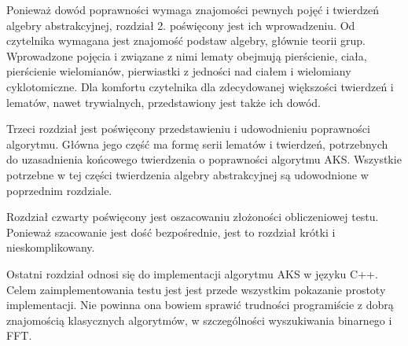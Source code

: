 \documentclass[declaration,shortabstract]{iithesis}
\theoremstyle{definition}
\theoremstyle{remark} \newtheorem{observation}{Obserwacja}
\theoremstyle{plain} \newtheorem{theorem}{Twierdzenie}
\theoremstyle{plain} \newtheorem{lemma}{Lemat}
\theoremstyle{remark} \newtheorem*{remark*}{Uwaga}
\theoremstyle{reminder} \newtheorem*{reminder*}{Przypomnienie}
\begin{document}
Ponieważ dowód poprawności wymaga znajomości pewnych pojęć i twierdzeń algebry abstrakcyjnej, rozdział 2. poświęcony jest ich wprowadzeniu. Od czytelnika wymagana jest znajomość podstaw algebry, głównie teorii grup. Wprowadzone pojęcia i związane z nimi lematy obejmują pierścienie, ciała, pierścienie wielomianów, pierwiastki z jedności nad ciałem i wielomiany cyklotomiczne. Dla komfortu czytelnika dla zdecydowanej większości twierdzeń i lematów, nawet trywialnych, przedstawiony jest także ich dowód.

Trzeci rozdział jest poświęcony przedstawieniu i udowodnieniu poprawności algorytmu. Główna jego część ma formę serii lematów i twierdzeń, potrzebnych do uzasadnienia końcowego twierdzenia o poprawności algorytmu AKS. Wszystkie potrzebne w tej części twierdzenia algebry abstrakcyjnej są udowodnione w poprzednim rozdziale.

Rozdział czwarty poświęcony jest oszacowaniu złożoności obliczeniowej testu. Ponieważ szacowanie jest dość bezpośrednie, jest to rozdział krótki i nieskomplikowany.

Ostatni rozdział odnosi się do implementacji algorytmu AKS w języku C++. Celem zaimplementowania testu jest jest przede wszystkim pokazanie prostoty implementacji. Nie powinna ona bowiem sprawić trudności programiście z dobrą znajomością klasycznych algorytmów, w szczególności wyszukiwania binarnego i FFT.









\end{document}
